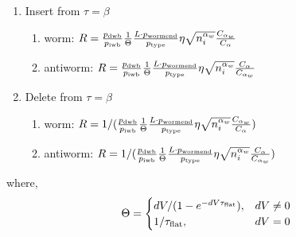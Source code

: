 \documentclass[12pt, two sided]{article}
\begin{document}
\begin{enumerate}
		\item Insert from $\tau=\beta$
		\begin{enumerate}
		\item{worm: $R =  \frac{p_{\rm{dwb}}}{p_{\rm{iwb}}} \frac{1}{\Theta}  \frac{L \cdot p_{\rm{wormend}}}{p_{\rm{type}}}\eta \sqrt{n_i^{\alpha_w}} \frac{C_{\alpha_w}}{C_{\alpha}} $}
		\item{antiworm: $R =  \frac{p_{\rm{dwb}}}{p_{\rm{iwb}}} \frac{1}{\Theta} \frac{L \cdot p_{\rm{wormend}}}{p_{\rm{type}}} \eta \sqrt{n_i^{\alpha_w}} \frac{C_{\alpha}}{C_{\alpha_w}}$}
		\end{enumerate}
		
		\item Delete from $\tau=\beta$ 
		\begin{enumerate}
		\item{worm: $R =  1/(\frac{p_{\rm{dwb}}}{p_{\rm{iwb}}} \frac{1}{\Theta}  \frac{L \cdot p_{\rm{wormend}}}{p_{\rm{type}}} \eta \sqrt{n_i^{\alpha_w}} \frac{C_{\alpha_w}}{C_{\alpha}})$}
		\item{antiworm: $R =  1/(\frac{p_{\rm{dwb}}}{p_{\rm{iwb}}} \frac{1}{\Theta}  \frac{L \cdot p_{\rm{wormend}}}{p_{\rm{type}}} \eta \sqrt{n_i^{\alpha_w}} \frac{C_{\alpha}}{C_{\alpha_w}})$}
		\end{enumerate}
		
	\end{enumerate}
	
	where,
	\begin{equation}
	\Theta = \begin{cases}
	dV/(1-e^{-dV\tau_{\rm{flat}}}), & dV\neq0 \\
	1/{\tau_{\rm{flat}}}, & dV=0
	\end{cases}
	\end{equation}

{} 
 \singlespacing


\doublespacing
\end{document}
